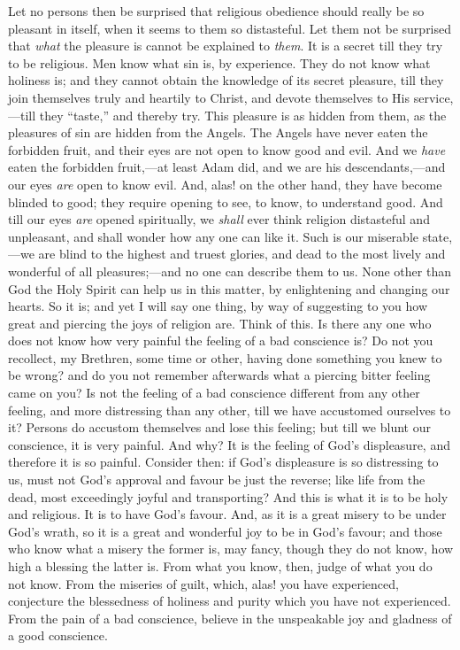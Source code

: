 Let no persons then be surprised that religious
obedience should really be so pleasant in itself, when it
seems to them so distasteful. Let them not be surprised
that \emph{what} the pleasure is cannot be explained to
\emph{them}. It is a secret till they try to be
religious. Men know what sin is, by experience. They do
not know what holiness is; and they cannot obtain the
knowledge of its secret pleasure, till they join
themselves truly and heartily to Christ, and devote
themselves to His service,—till they
``taste,'' and thereby try. This pleasure is as
hidden from them, as the pleasures of sin are hidden from
the Angels. The Angels have never eaten the forbidden
fruit, and their eyes are not open to know good and evil.
And we \emph{have} eaten the forbidden fruit,—at
least Adam did, and we are his descendants,—and our
eyes \emph{are} open to know evil. And, alas! on the
other hand, they have become blinded to good; they
require opening to see, to know, to understand good. And
till our eyes \emph{are} opened spiritually, we \emph{shall}
ever think religion distasteful and unpleasant, and shall
wonder how any one can like it. Such is our miserable
state,—we are blind to the highest and truest
glories, and dead to the most lively and wonderful of all
pleasures;—and no one can describe them to us. None
other than God the Holy Spirit can help us in this
matter, by enlightening and changing our hearts. So it
is; and yet I will say one thing, by way of suggesting to
you how great and piercing the joys of religion are.
Think of this. Is there any one who does not know how
very painful the feeling of a bad conscience is? Do not
you recollect, my Brethren, some time or other, having
done something you knew to be wrong? and do you not
remember afterwards what a piercing bitter feeling came
on you? Is not the feeling of a bad conscience different
from any other feeling, and more distressing than any
other, till we have accustomed ourselves to it? Persons
do accustom themselves and lose this feeling; but till we
blunt our conscience, it is very painful. And why? It is
the feeling of God's displeasure, and therefore it is so
painful. Consider then: if God's displeasure is so
distressing to us, must not God's approval and favour be
just the reverse; like life from the dead, most
exceedingly joyful and transporting? And this is what it
is to be holy and religious. It is to have God's favour.
And, as it is a great misery to be under God's wrath, so
it is a great and wonderful joy to be in God's favour;
and those who know what a misery the former is, may
fancy, though they do not know, how high a blessing the
latter is. From what you know, then, judge of what you do
not know. From the miseries of guilt, which, alas! you
have experienced, conjecture the blessedness of holiness
and purity which you have not experienced. From the pain
of a bad conscience, believe in the unspeakable joy and
gladness of a good conscience.

